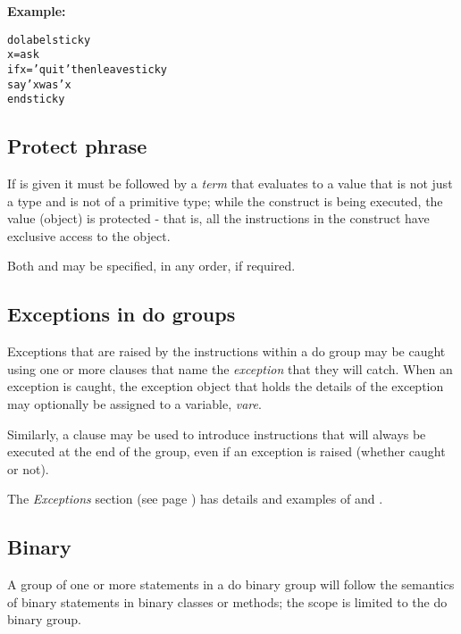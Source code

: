 \textbf{Example:}
\begin{alltt}
do label sticky
  x=ask
  if x='quit' then leave sticky
  say 'x was' x
  end sticky
\end{alltt}
\subsection{Protect phrase}
 
If  is given it must be followed by a \emph{term}
that evaluates to a value that is not just a type and is not of a
primitive type; while the  construct is being executed, the
value (object) is protected - that is, all the instructions in the
 construct have exclusive access to the object.
 
Both  and  may be specified, in any order,
if required.
\subsection{Exceptions in do groups}
 
Exceptions that are raised by the instructions within a do group may be
caught using one or more  clauses that name the
\emph{exception} that they will catch.
When an exception is caught, the exception object that holds the details
of the exception may optionally be assigned to a variable,
\emph{vare}.
 
Similarly, a  clause may be used to introduce
instructions that will always be executed at the end of the group, even
if an exception is raised (whether caught or not).
 
The  \emph{Exceptions} section (see page \pageref{refexcep})  has details and
examples of  and .

\subsection{Binary}
A group of one or more statements in a do binary group will
follow the semantics of binary statements in binary classes or
methods; the scope is limited to the do binary group.